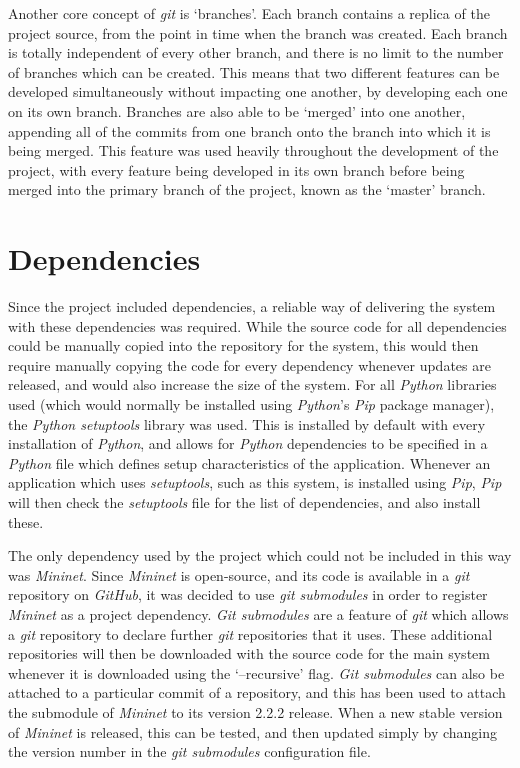 Another core concept of \textit{git} is `branches'.
Each branch contains a replica of the project source, from the point in time when the branch was created.
Each branch is totally independent of every other branch, and there is no limit to the number of branches which can be created.
This means that two different features can be developed simultaneously without impacting one another, by developing each one on its own branch.
Branches are also able to be `merged' into one another, appending all of the commits from one branch onto the branch into which it is being merged.
This feature was used heavily throughout the development of the project, with every feature being developed in its own branch before being merged into the primary branch of the project, known as the `master' branch.

\section{Dependencies}
\label{dependencies}

Since the project included dependencies, a reliable way of delivering the system with these dependencies was required.
While the source code for all dependencies could be manually copied into the repository for the system, this would then require manually copying the code for every dependency whenever updates are released, and would also increase the size of the system.
For all \textit{Python} libraries used (which would normally be installed using \textit{Python}'s \textit{Pip} package manager), the \textit{Python setuptools} \cite{python_setuptools} library was used.
This is installed by default with every installation of \textit{Python}, and allows for \textit{Python} dependencies to be specified in a \textit{Python} file which defines setup characteristics of the application.
Whenever an application which uses \textit{setuptools}, such as this system, is installed using \textit{Pip}, \textit{Pip} will then check the \textit{setuptools} file for the list of dependencies, and also install these.

The only dependency used by the project which could not be included in this way was \textit{Mininet}.
Since \textit{Mininet} is open-source, and its code is available in a \textit{git} repository on \textit{GitHub}, it was decided to use \textit{git submodules} in order to register \textit{Mininet} as a project dependency.
\textit{Git submodules} are a feature of \textit{git} which allows a \textit{git} repository to declare further \textit{git} repositories that it uses.
These additional repositories will then be downloaded with the source code for the main system whenever it is downloaded using the `--recursive' flag.
\textit{Git submodules} can also be attached to a particular commit of a repository, and this has been used to attach the submodule of \textit{Mininet} to its version 2.2.2 release.
When a new stable version of \textit{Mininet} is released, this can be tested, and then updated simply by changing the version number in the \textit{git submodules} configuration file.
